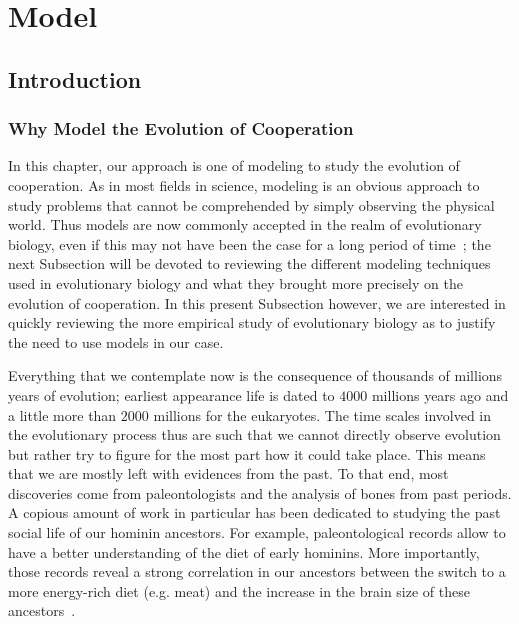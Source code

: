\chapter{Model}
\label{chapter:model}

\minitoc[n] %

\section{Introduction}

  \subsection{Why Model the Evolution of Cooperation}

    In this chapter, our approach is one of modeling to study the evolution of cooperation. As in most fields in science, modeling is an obvious approach to study problems that cannot be comprehended by simply observing the physical world. Thus models are now commonly accepted in the realm of evolutionary biology, even if this may not have been the case for a long period of time~\cite{Shou2015}; the next Subsection will be devoted to reviewing the different modeling techniques used in evolutionary biology and what they brought more precisely on the evolution of cooperation. In this present Subsection however, we are interested in quickly reviewing the more empirical study of evolutionary biology as to justify the need to use models in our case. 

    Everything that we contemplate now is the consequence of thousands of millions years of evolution; earliest appearance life is dated to $4000$ millions years ago and a little more than $2000$ millions for the eukaryotes. The time scales involved in the evolutionary process thus are such that we cannot directly observe evolution but rather try to figure for the most part how it could take place. This means that we are mostly left with evidences from the past. To that end, most discoveries come from paleontologists and the analysis of bones from past periods. A copious amount of work in particular has been dedicated to studying the past social life of our hominin ancestors. For example, paleontological records allow to have a better understanding of the diet of early hominins. More importantly, those records reveal a strong correlation in our ancestors between the switch to a more energy-rich diet (e.g. meat) and the increase in the brain size of these ancestors~\cite{Aiello1995, Wrangham1999}. 

